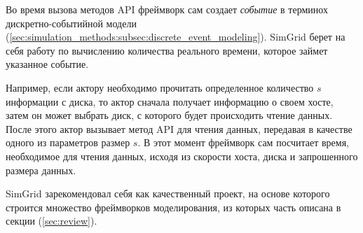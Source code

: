\documentclass[../diploma.tex]{subfile}
\begin{document}
    Во время вызова методов API фреймворк сам создает \textit{событие} в
    терминох дискретно-событийной модели
    (\ref{sec:simulation_methods:subsec:discrete_event_modeling}). SimGrid берет
    на себя работу по вычислению количества реального времени, которое займет
    указанное событие. 
    
    Например, если актору необходимо прочитать определенное количество $s$
    информации с диска, то актор сначала получает информацию о своем хосте,
    затем он может выбрать диск, с которого будет происходить чтение данных.
    После этого актор вызывает метод API для чтения данных, передавая в качестве
    одного из параметров размер $s$. В этот момент фреймворк сам посчитает
    время, необходимое для чтения данных, исходя из скорости хоста, диска и
    запрошенного размера данных. 

    SimGrid зарекомендовал себя как качественный проект, на основе которого
    строится множество фреймворков моделирования, из которых часть описана в
    секции (\ref{sec:review}).
\end{document}
